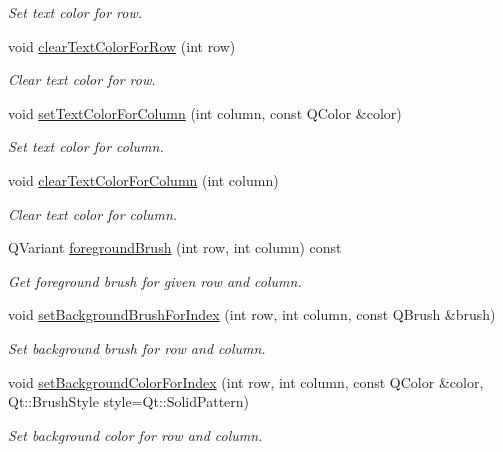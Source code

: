 \begin{DoxyCompactItemize}
\begin{DoxyCompactList}\small\item\em Set text color for row. \end{DoxyCompactList}\item 
void \hyperlink{class_mdt_1_1_item_model_1_1_format_proxy_model_ae3c6bc6f0436b5cbd1d1b061e62948c7}{clear\+Text\+Color\+For\+Row} (int row)
\begin{DoxyCompactList}\small\item\em Clear text color for row. \end{DoxyCompactList}\item 
void \hyperlink{class_mdt_1_1_item_model_1_1_format_proxy_model_a4ecef92f0132362ea2dad7c711a623d7}{set\+Text\+Color\+For\+Column} (int column, const Q\+Color \&color)
\begin{DoxyCompactList}\small\item\em Set text color for column. \end{DoxyCompactList}\item 
void \hyperlink{class_mdt_1_1_item_model_1_1_format_proxy_model_a407ad81b4d1f97878842ef0a5ce2cd94}{clear\+Text\+Color\+For\+Column} (int column)
\begin{DoxyCompactList}\small\item\em Clear text color for column. \end{DoxyCompactList}\item 
Q\+Variant \hyperlink{class_mdt_1_1_item_model_1_1_format_proxy_model_a42f07b1445dcdd5ea208eded4bb557ce}{foreground\+Brush} (int row, int column) const 
\begin{DoxyCompactList}\small\item\em Get foreground brush for given row and column. \end{DoxyCompactList}\item 
void \hyperlink{class_mdt_1_1_item_model_1_1_format_proxy_model_a119636372551bb2ad0eb05faff1b96f1}{set\+Background\+Brush\+For\+Index} (int row, int column, const Q\+Brush \&brush)
\begin{DoxyCompactList}\small\item\em Set background brush for row and column. \end{DoxyCompactList}\item 
void \hyperlink{class_mdt_1_1_item_model_1_1_format_proxy_model_ad725f90eb48907b2394d584dff4fdb6e}{set\+Background\+Color\+For\+Index} (int row, int column, const Q\+Color \&color, Qt\+::\+Brush\+Style style=Qt\+::\+Solid\+Pattern)
\begin{DoxyCompactList}\small\item\em Set background color for row and column. \end{DoxyCompactList}\item 

\end{DoxyCompactItemize}
